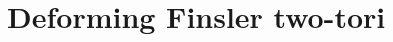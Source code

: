 \documentclass[AHL,Unicode,longabstracts,published]{cedram}
\newcommand{\Z}{\mathbb{Z}}
\newcommand{\R}{\mathbb{R}}
\begin{document}

\section{Deforming Finsler two-tori}
\end{document}
